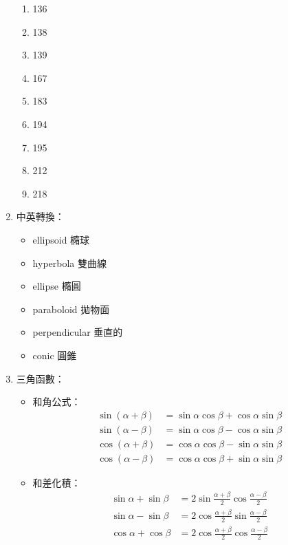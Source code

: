 \begin{enumerate}
\begin{enumerate}
        \item 136
        \item 138
        \item 139
        \item 167
        \item 183
        \item 194
        \item 195
        \item 212
        \item 218
    \end{enumerate}
    \item 中英轉換：
    \begin{itemize}
        \item ellipsoid 橢球
        \item hyperbola 雙曲線
        \item ellipse 橢圓
        \item paraboloid 拋物面
        \item perpendicular 垂直的
        \item conic 圓錐
    \end{itemize}
    \item 三角函數：
    \begin{itemize}
        \item 和角公式： \begin{subequations}
                \begin{align}
                    \sin(\alpha + \beta) & = \sin\alpha\cos\beta + \cos\alpha\sin\beta \\
                    \sin(\alpha - \beta) & = \sin\alpha\cos\beta - \cos\alpha\sin\beta \\
                    \cos(\alpha + \beta) & = \cos\alpha\cos\beta - \sin\alpha\sin\beta \\
                    \cos(\alpha - \beta) & = \cos\alpha\cos\beta + \sin\alpha\sin\beta
                \end{align}
            \end{subequations}
        \item 和差化積： \begin{subequations}
            \begin{align}
                \sin\alpha + \sin\beta & = 2\sin\frac{\alpha + \beta}{2}\cos\frac{\alpha - \beta}{2} \\
                \sin\alpha - \sin\beta & = 2\cos\frac{\alpha + \beta}{2}\sin\frac{\alpha - \beta}{2} \\
                \cos\alpha + \cos\beta & = 2\cos\frac{\alpha + \beta}{2}\cos\frac{\alpha - \beta}{2} \\

\end{align}
\end{subequations}
\end{itemize}
\end{enumerate}
